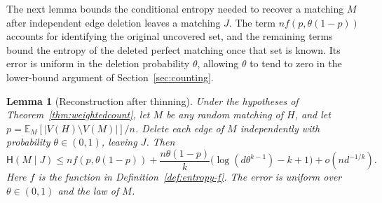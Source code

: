 \documentclass[11pt,reqno]{amsart}
\numberwithin{equation}{section}
\theoremstyle{plain}
\newtheorem{lemma}[theorem]{Lemma}
\theoremstyle{definition}
\newcommand{\E}{\mathbb E}
\newcommand{\HH}{\mathsf H}
\begin{document}
The next lemma bounds the conditional entropy needed to recover a matching $M$ after independent edge deletion leaves a matching $J$.
The term $nf(p,\theta(1-p))$ accounts for identifying the original uncovered set, and the remaining terms bound the entropy of the deleted perfect matching once that set is known.
Its error is uniform in the deletion probability $\theta$, allowing $\theta$ to tend to zero in the lower-bound argument of Section~\ref{sec:counting}.

\begin{lemma}[Reconstruction after thinning]\label{lem:reconstruction}
    Under the hypotheses of Theorem~\ref{thm:weightedcount}, let $M$ be any random matching of $H$, and let $p=\E_M[|V(H)\setminus V(M)|]/n$.
    Delete each edge of $M$ independently with probability $\theta\in(0,1)$, leaving $J$.
    Then
    \[
        \HH(M\mid J)\le nf(p,\theta(1-p))
        +\frac{n\theta(1-p)}k\bigl(\log(d\theta^{k-1})-k+1\bigr)+o(nd^{-1/k}).
    \]
    Here $f$ is the function in Definition~\ref{def:entropy-f}.
    The error is uniform over $\theta\in(0,1)$ and the law of $M$.
\end{lemma}
\end{document}
